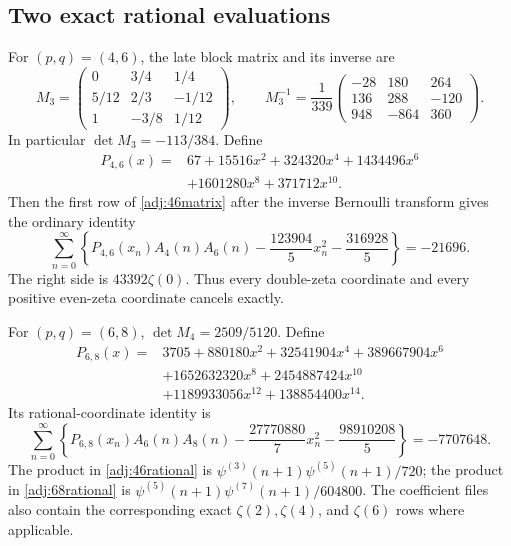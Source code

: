 \documentclass[11pt,a4paper]{article}
\numberwithin{equation}{section}
\theoremstyle{definition}
\theoremstyle{remark}
\begin{document}
\subsection{Two exact rational evaluations}

For $(p,q)=(4,6)$, the late block matrix and its inverse are
\begin{equation}\label{adj:46matrix}
 M_3=\begin{pmatrix}
 0&3/4&1/4\\5/12&2/3&-1/12\\1&-3/8&1/12
 \end{pmatrix},\qquad
 M_3^{-1}=\frac1{339}
 \begin{pmatrix}-28&180&264\\136&288&-120\\948&-864&360\end{pmatrix}.
\end{equation}
In particular $\det M_3=-113/384$.  Define
\begin{equation}\label{adj:P46}
 \begin{split}
 P_{4,6}(x)={}&67+15516x^2+324320x^4+1434496x^6\\
             &+1601280x^8+371712x^{10}.
 \end{split}
\end{equation}
Then the first row of \eqref{adj:46matrix} after the inverse
Bernoulli transform gives the ordinary identity
\begin{equation}\label{adj:46rational}
 \sum_{n=0}^{\infty}\left\{
 P_{4,6}(x_n)A_4(n)A_6(n)
 -\frac{123904}{5}x_n^2-\frac{316928}{5}
 \right\}=-21696.
\end{equation}
The right side is $43392\zeta(0)$.  Thus every double-zeta
coordinate and every positive even-zeta coordinate cancels
exactly.

For $(p,q)=(6,8)$, $\det M_4=2509/5120$.  Define
\begin{equation}\label{adj:P68}
 \begin{split}
 P_{6,8}(x)={}&3705+880180x^2+32541904x^4+389667904x^6\\
 &+1652632320x^8+2454887424x^{10}\\
 &+1189933056x^{12}+138854400x^{14}.
 \end{split}
\end{equation}
Its rational-coordinate identity is
\begin{equation}\label{adj:68rational}
 \sum_{n=0}^{\infty}\left\{
 P_{6,8}(x_n)A_6(n)A_8(n)
 -\frac{27770880}{7}x_n^2-\frac{98910208}{5}
 \right\}=-7707648.
\end{equation}
The product in \eqref{adj:46rational} is
$\psi^{(3)}(n+1)\psi^{(5)}(n+1)/720$; the product in
\eqref{adj:68rational} is
$\psi^{(5)}(n+1)\psi^{(7)}(n+1)/604800$.
The coefficient files also contain the corresponding exact
$\zeta(2),\zeta(4)$, and $\zeta(6)$ rows where applicable.
\end{document}

